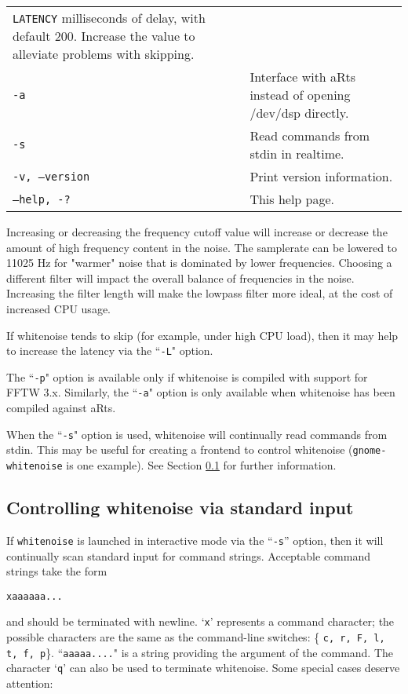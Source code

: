 \documentclass[12pt,oneside,notitlepage]{article}
\begin{document}
\begin{longtable}{lp{4in}}
                        {\tt LATENCY} milliseconds of delay, with default
                        200.  Increase the value to alleviate
                        problems with skipping. \\
  {\tt -a} &            Interface with aRts instead of opening
                        /dev/dsp directly. \\
  {\tt -s} &            Read commands from stdin in realtime. \\
  {\tt -v, --version} & Print version information. \\
  {\tt --help, -?} &    This help page. \\
\end{longtable}

Increasing or decreasing the frequency cutoff value will increase or decrease
the amount of high frequency content in the noise.  The samplerate can be
lowered to 11025 Hz for "warmer" noise that is dominated by lower frequencies.
Choosing a different filter will impact the overall balance of frequencies in
the noise.  Increasing the filter length will make the lowpass filter more
ideal, at the cost of increased CPU usage.

If whitenoise tends to skip (for example, under high CPU load), then it may
help to increase the latency via the ``{\tt -L}" option.

The ``{\tt -p}" option is available only if whitenoise is compiled with support
for FFTW 3.x.  Similarly, the ``{\tt -a}" option is only available when whitenoise
has been compiled against aRts.

When the ``{\tt -s}" option is used, whitenoise will continually read commands
from stdin.  This may be useful for creating a frontend to control
whitenoise ({\tt gnome-whitenoise} is one example).  See Section \ref{stdin} for
further information.

\subsection{Controlling whitenoise via standard input}
\label{stdin}
If {\tt whitenoise} is launched in interactive mode via the ``{\tt -s}'' option,
then it will continually scan standard input for command strings.
Acceptable command strings take the form
\begin{verbatim}
xaaaaaa...
\end{verbatim}
and should be terminated with newline.  `{\tt x}' represents a command character; the
possible characters are the same as the command-line switches: \{ {\tt c, r, F, l, t, f, p}\}.
``{\tt aaaaa....}" is a string providing the argument of the command.  The character `{\tt q}'
can also be used to terminate whitenoise.  Some special cases deserve attention:
\end{document}
